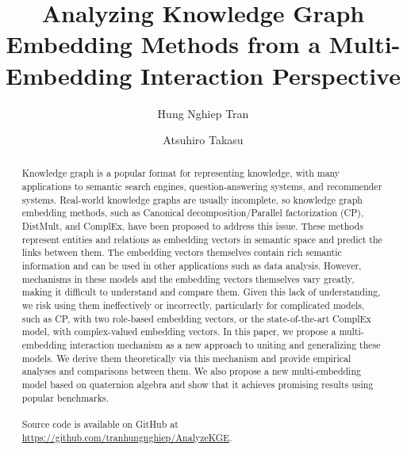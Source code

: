 \documentclass[sigconf,edbt]{acmart-edbt2019}
\begin{document}

\setlength\belowdisplayskip{0pt}
\setlength\belowdisplayshortskip{0pt}


\title{Analyzing Knowledge Graph Embedding Methods from a Multi-Embedding Interaction Perspective}
\author{Hung Nghiep Tran}
\author{Atsuhiro Takasu}

\begin{abstract}
Knowledge graph is a popular format for representing knowledge, with many applications to semantic search engines, question-answering systems, and recommender systems. Real-world knowledge graphs are usually incomplete, so knowledge graph embedding methods, such as Canonical decomposition/Parallel factorization (CP), DistMult, and ComplEx, have been proposed to address this issue. These methods represent entities and relations as embedding vectors in semantic space and predict the links between them. The embedding vectors themselves contain rich semantic information and can be used in other applications such as data analysis. However, mechanisms in these models and the embedding vectors themselves vary greatly, making it difficult to understand and compare them. Given this lack of understanding, we risk using them ineffectively or incorrectly, particularly for complicated models, such as CP, with two role-based embedding vectors, or the state-of-the-art ComplEx model, with complex-valued embedding vectors. In this paper, we propose a multi-embedding interaction mechanism as a new approach to uniting and generalizing these models. We derive them theoretically via this mechanism and provide empirical analyses and comparisons between them. We also propose a new multi-embedding model based on quaternion algebra and show that it achieves promising results using popular benchmarks. \\\\Source code is available on GitHub at \\\url{https://github.com/tranhungnghiep/AnalyzeKGE}.
\end{abstract}

\end{document}
